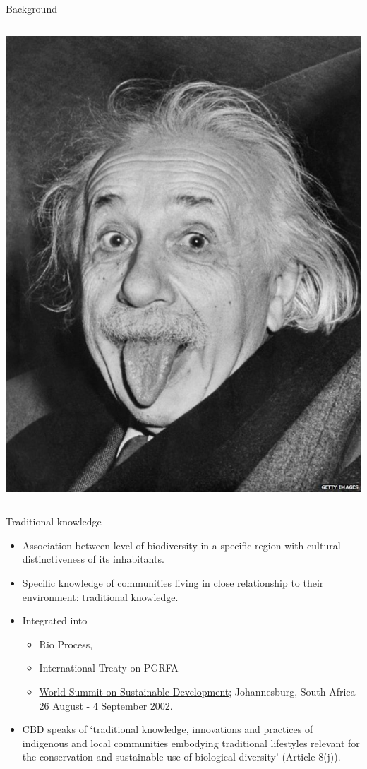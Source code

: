 \documentclass[
  ignorenonframetext,
  aspectratio=169]{beamer}
\providecommand{\tightlist}{%
  \setlength{\itemsep}{0pt}\setlength{\parskip}{0pt}}
\begin{document}
\begin{frame}{Background}
\begin{columns}[T,onlytextwidth]
\includegraphics[width=0.9\linewidth]{../images/einstein_ipr} 

\end{columns}
\end{frame}

\begin{frame}{Traditional knowledge}
\protect\hypertarget{traditional-knowledge}{}
\begin{itemize}
\tightlist
\item
  Association between level of biodiversity in a specific region with
  cultural distinctiveness of its inhabitants.
\item
  Specific knowledge of communities living in close relationship to
  their environment: traditional knowledge.
\item
  Integrated into

  \begin{itemize}
  \tightlist
  \item
    Rio Process,
  \item
    International Treaty on PGRFA
  \item
    \href{https://sustainabledevelopment.un.org/milesstones/wssd}{World
    Summit on Sustainable Development}; Johannesburg, South Africa 26
    August - 4 September 2002.
  \end{itemize}
\item
  CBD speaks of `traditional knowledge, innovations and practices of
  indigenous and local communities embodying traditional lifestyles
  relevant for the conservation and sustainable use of biological
  diversity' (Article 8(j)).
\end{itemize}
\end{frame}
\end{document}
